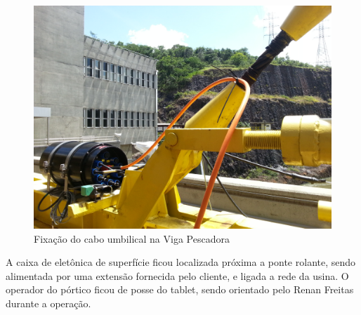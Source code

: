 \begin{figure}[h!]
\centering
	\includegraphics[width=0.8\columnwidth]{figs/fix_umbilical}
	\caption{Fixação do cabo umbilical na Viga Pescadora}
	\label{fig::fix_umbilical}
\end{figure} 
 
 A caixa de eletônica de superfície ficou localizada próxima a ponte rolante,
 sendo alimentada por uma extensão fornecida pelo cliente, e ligada a rede da
 usina. O operador do pórtico ficou de posse do tablet, sendo orientado pelo
 Renan Freitas durante a operação.
